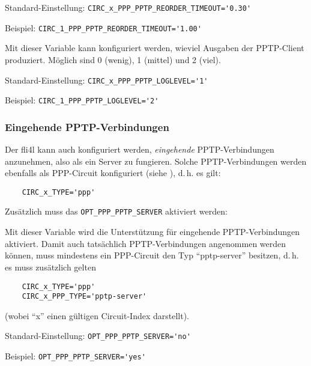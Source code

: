 \begin{description}
Standard-Einstellung: \verb+CIRC_x_PPP_PPTP_REORDER_TIMEOUT='0.30'+

Beispiel: \verb+CIRC_1_PPP_PPTP_REORDER_TIMEOUT='1.00'+


Mit dieser Variable kann konfiguriert werden, wieviel Ausgaben der PPTP-Client
produziert. Möglich sind 0 (wenig), 1 (mittel) und 2 (viel).

Standard-Einstellung: \verb+CIRC_x_PPP_PPTP_LOGLEVEL='1'+

Beispiel: \verb+CIRC_1_PPP_PPTP_LOGLEVEL='2'+

\end{description}

\subsubsection{Eingehende PPTP-Verbindungen}

Der fli4l kann auch konfiguriert werden, \emph{eingehende} PPTP-Verbindungen
anzunehmen, also als ein Server zu fungieren. Solche PPTP-Verbindungen werden
ebenfalls als PPP-Circuit konfiguriert (siehe
), d.\,h. es gilt:

\begin{example}
\begin{verbatim}
    CIRC_x_TYPE='ppp'
\end{verbatim}
\end{example}

Zusätzlich muss das \verb+OPT_PPP_PPTP_SERVER+ aktiviert werden:

\begin{description}

Mit dieser Variable wird die Unterstützung für eingehende PPTP-Verbindungen
aktiviert.
Damit auch tatsächlich PPTP-Verbindungen angenommen werden können, muss
mindestens ein PPP-Circuit den Typ ``pptp-server'' besitzen, d.\,h. es muss
zusätzlich gelten

\begin{example}
\begin{verbatim}
    CIRC_x_TYPE='ppp'
    CIRC_x_PPP_TYPE='pptp-server'
\end{verbatim}
\end{example}

(wobei ``x'' einen gültigen Circuit-Index darstellt).

Standard-Einstellung: \verb+OPT_PPP_PPTP_SERVER='no'+

Beispiel: \verb+OPT_PPP_PPTP_SERVER='yes'+
\end{description}

